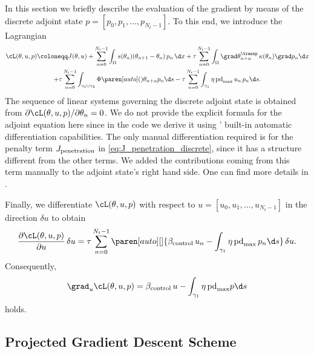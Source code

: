 In this section we briefly describe the evaluation of the gradient by means of the discrete adjoint state $p = [p_0, p_1, \ldots, p_{N_t-1}]$.
To this end, we introduce the Lagrangian 
\begin{multline} \label{eq:lagrange}
	\cL(\theta,u,p) \coloneqq
	J(\theta,u)
	+
	\sum_{n=0}^{N_t-1}\int_{\Omega} s(\theta_n) (\theta_{n+1}-\theta_n) \, p_n \, \d x
	+ 
	\tau \sum_{n=0}^{N_t-1}\int_{\Omega} \grad \theta_{n+\alpha}^\transp \, \kappa(\theta_n) \grad p_n \d x
	\\
	+ 
	\tau \sum_{n=0}^{N_t-1}\int_{\gamma_1 \cup \gamma_2} \Phi \paren[auto](){\theta_{n+\alpha}} p_n \d s
	- 
	\tau \sum_{n=0}^{N_t-1}\int_{\gamma_1} \eta \, \text{pd}_{\max} \, u_n \, p_n \d s.
\end{multline}
The sequence of linear systems governing the discrete adjoint state is obtained from $\partial \cL(\theta,u,p)/\partial \theta_n = 0$.
We do not provide the explicit formula for the adjoint equation here since in the code we derive it using \fenics' built-in automatic differentiation capabilities.
The only manual differentiation required is for the penalty term $J_\textup{penetration}$ in \eqref{eq:J_penetration_discrete}, since it has a structure different from the other terms.
We added the contributions coming from this term manually to the adjoint state's right hand side.
One can find more details in \cite[\texttt{optipuls.core}]{optipuls_github}.

Finally, we differentiate $\cL(\theta,u,p)$ with respect to $u = [u_0, u_1, \ldots, u_{N_t-1}]$ in the direction $\delta u$ to obtain
\begin{equation}
	\frac{\partial \cL(\theta,u,p)}{\partial u} \, \delta u
	=
	\tau \sum_{n=0}^{N_t-1}
	\paren[auto][]{\beta_\textup{control} \, u_n - \int_{\gamma_1} \eta \, \text{pd}_{\max} \, p_n \d s} \, \delta u
	.
\end{equation}
Consequently,
\begin{equation} \label{eq:gradient}
	\grad_u \cL(\theta, u, p) 
	= 
	\beta_\textup{control}\, u - \int_{\gamma_1} \eta \, \text{pd}_{\max} p \d s
\end{equation}
holds.


\subsection{Projected Gradient Descent Scheme}

